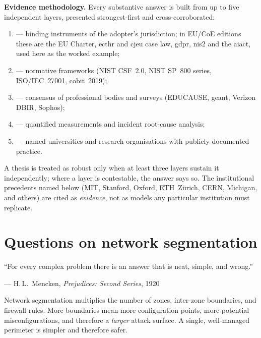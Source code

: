 \noindent\textbf{Evidence methodology.} Every substantive answer is built from
up to five independent layers, presented strongest-first and cross-corroborated:
\begin{enumerate}[nosep,leftmargin=2em]
  \item {} --- binding instruments of the adopter's jurisdiction; in
    EU/CoE editions these are the EU Charter, \gls{ecthr} and \gls{cjeu} case law,
    \gls{gdpr}, \gls{nis2} and the \gls{aiact}, used here as the worked example;
  \item {} --- normative frameworks (NIST CSF~2.0, NIST SP~800
    series, ISO/IEC~27001, \gls{cobit}~2019);
  \item {} --- consensus of professional bodies and surveys
    (EDUCAUSE, \gls{geant}, Verizon DBIR, Sophos);
  \item {} --- quantified measurements and incident
    root-cause analysis;
  \item {} --- named universities and research
    organisations with publicly documented practice.
\end{enumerate}
\noindent A thesis is treated as robust only when at least three layers sustain
it independently; where a layer is contestable, the answer says so. The
institutional precedents named below (MIT, Stanford, Oxford, ETH~Z\"urich,
CERN, Michigan, and others) are cited as \emph{evidence}, not as models any
particular institution must replicate.

\section{Questions on network segmentation}
\label{sec:q-segmentation}

\epigraph{``For every complex problem there is an answer that is neat, simple, and wrong.''}{--- H.\,L.\ Mencken, \textit{Prejudices: Second Series}, 1920}

\begin{questionbox}
Network segmentation multiplies the number of zones, inter-zone boundaries, and firewall rules. More boundaries mean more configuration points, more potential misconfigurations, and therefore a \emph{larger} attack surface. A single, well-managed perimeter is simpler and therefore safer.
\end{questionbox}

